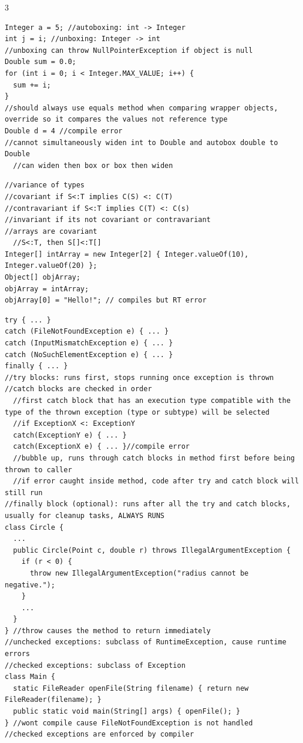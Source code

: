 \documentclass[10pt]{article}
\begin{document}
\begin{multicols*}{3}
\begin{verbatim}
Integer a = 5; //autoboxing: int -> Integer
int j = i; //unboxing: Integer -> int
//unboxing can throw NullPointerException if object is null
Double sum = 0.0;
for (int i = 0; i < Integer.MAX_VALUE; i++) {
  sum += i;
}
//should always use equals method when comparing wrapper objects, override so it compares the values not reference type
Double d = 4 //compile error
//cannot simultaneously widen int to Double and autobox double to Double
  //can widen then box or box then widen
\end{verbatim}
\begin{verbatim}
//variance of types
//covariant if S<:T implies C(S) <: C(T)
//contravariant if S<:T implies C(T) <: C(s)
//invariant if its not covariant or contravariant
//arrays are covariant
  //S<:T, then S[]<:T[]
Integer[] intArray = new Integer[2] { Integer.valueOf(10), Integer.valueOf(20) };
Object[] objArray;
objArray = intArray;
objArray[0] = "Hello!"; // compiles but RT error
\end{verbatim}
\begin{verbatim}
try { ... }
catch (FileNotFoundException e) { ... }
catch (InputMismatchException e) { ... }
catch (NoSuchElementException e) { ... }
finally { ... }
//try blocks: runs first, stops running once exception is thrown
//catch blocks are checked in order
  //first catch block that has an execution type compatible with the type of the thrown exception (type or subtype) will be selected
  //if ExceptionX <: ExceptionY
  catch(ExceptionY e) { ... } 
  catch(ExceptionX e) { ... }//compile error
  //bubble up, runs through catch blocks in method first before being thrown to caller
  //if error caught inside method, code after try and catch block will still run
//finally block (optional): runs after all the try and catch blocks, usually for cleanup tasks, ALWAYS RUNS
class Circle {
  ... 
  public Circle(Point c, double r) throws IllegalArgumentException {
    if (r < 0) {
      throw new IllegalArgumentException("radius cannot be negative.");
    }
    ...
  }
} //throw causes the method to return immediately
//unchecked exceptions: subclass of RuntimeException, cause runtime errors
//checked exceptions: subclass of Exception
class Main {
  static FileReader openFile(String filename) { return new FileReader(filename); }
  public static void main(String[] args) { openFile(); }
} //wont compile cause FileNotFoundException is not handled
//checked exceptions are enforced by compiler

\end{verbatim}
\end{multicols*}
\end{document}
